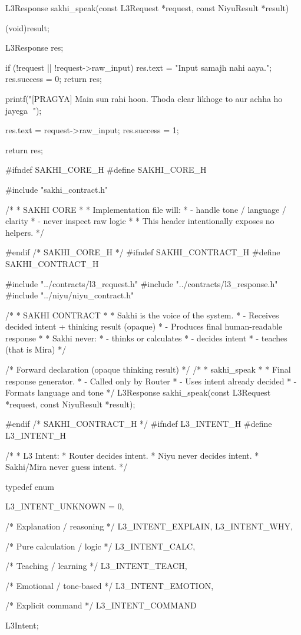 \documentclass{article}
\begin{document}
L3Response sakhi_speak(const L3Request *request,
                       const NiyuResult *result)
{
    (void)result;

    L3Response res;

    if (!request || !request->raw_input)
    {
        res.text = "Input samajh nahi aaya.";
        res.success = 0;
        return res;
    }

    printf("[PRAGYA] Main sun rahi hoon. Thoda clear likhoge to aur achha ho jayega 🙂\n");

    res.text = request->raw_input;
    res.success = 1;

    return res;
}
#ifndef SAKHI_CORE_H
#define SAKHI_CORE_H

#include "sakhi_contract.h"

/*
 * SAKHI CORE
 *
 * Implementation file will:
 * - handle tone / language / clarity
 * - never inspect raw logic
 *
 * This header intentionally exposes no helpers.
 */

#endif /* SAKHI_CORE_H */
#ifndef SAKHI_CONTRACT_H
#define SAKHI_CONTRACT_H

#include "../contracts/l3_request.h"
#include "../contracts/l3_response.h"
#include "../niyu/niyu_contract.h"

/*
 * SAKHI CONTRACT
 *
 * Sakhi is the voice of the system.
 * - Receives decided intent + thinking result (opaque)
 * - Produces final human-readable response
 *
 * Sakhi never:
 * - thinks or calculates
 * - decides intent
 * - teaches (that is Mira)
 */

/* Forward declaration (opaque thinking result) */
/*
 * sakhi_speak
 *
 * Final response generator.
 * - Called only by Router
 * - Uses intent already decided
 * - Formats language and tone
 */
L3Response sakhi_speak(const L3Request *request,
                       const NiyuResult *result);

#endif /* SAKHI_CONTRACT_H */
#ifndef L3_INTENT_H
#define L3_INTENT_H

/* 
 * L3 Intent:
 * Router decides intent.
 * Niyu never decides intent.
 * Sakhi/Mira never guess intent.
 */

typedef enum {
    L3_INTENT_UNKNOWN = 0,

    /* Explanation / reasoning */
    L3_INTENT_EXPLAIN,
    L3_INTENT_WHY,

    /* Pure calculation / logic */
    L3_INTENT_CALC,

    /* Teaching / learning */
    L3_INTENT_TEACH,

    /* Emotional / tone-based */
    L3_INTENT_EMOTION,

    /* Explicit command */
    L3_INTENT_COMMAND

} L3Intent;
\end{document}
